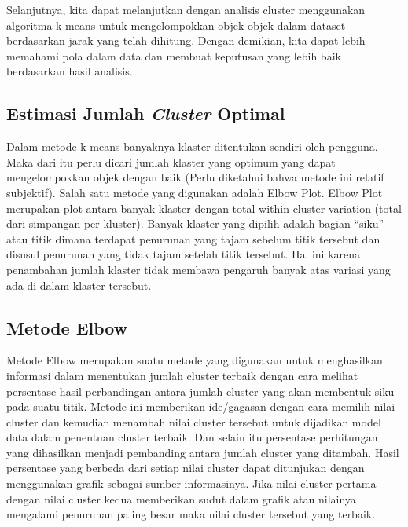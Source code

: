 \documentclass[
  oneside]{book}
\begin{document}
Selanjutnya, kita dapat melanjutkan dengan analisis cluster menggunakan algoritma k-means untuk mengelompokkan objek-objek dalam dataset berdasarkan jarak yang telah dihitung. Dengan demikian, kita dapat lebih memahami pola dalam data dan membuat keputusan yang lebih baik berdasarkan hasil analisis.

\subsection*{\texorpdfstring{Estimasi Jumlah \emph{Cluster} Optimal}{Estimasi Jumlah Cluster Optimal}}\label{estimasi-jumlah-cluster-optimal}

Dalam metode k-means banyaknya klaster ditentukan sendiri oleh pengguna. Maka dari itu perlu dicari jumlah klaster yang optimum yang dapat mengelompokkan objek dengan baik (Perlu diketahui bahwa metode ini relatif subjektif). Salah satu metode yang digunakan adalah Elbow Plot. Elbow Plot merupakan plot antara banyak klaster dengan total within-cluster variation (total dari simpangan per kluster). Banyak klaster yang dipilih adalah bagian ``siku'' atau titik dimana terdapat penurunan yang tajam sebelum titik tersebut dan disusul penurunan yang tidak tajam setelah titik tersebut. Hal ini karena penambahan jumlah klaster tidak membawa pengaruh banyak atas variasi yang ada di dalam klaster tersebut.

\subsection*{Metode Elbow}\label{metode-elbow}

Metode Elbow merupakan suatu metode yang digunakan untuk menghasilkan informasi dalam menentukan jumlah cluster terbaik dengan cara melihat persentase hasil perbandingan antara jumlah cluster yang akan membentuk siku pada suatu titik. Metode ini memberikan ide/gagasan dengan cara memilih nilai cluster dan kemudian menambah nilai cluster tersebut untuk dijadikan model data dalam penentuan cluster terbaik. Dan selain itu persentase perhitungan yang dihasilkan menjadi pembanding antara jumlah cluster yang ditambah. Hasil persentase yang berbeda dari setiap nilai cluster dapat ditunjukan dengan menggunakan grafik sebagai sumber informasinya. Jika nilai cluster pertama dengan nilai cluster kedua memberikan sudut dalam grafik atau nilainya mengalami penurunan paling besar maka nilai cluster tersebut yang terbaik.
\end{document}
